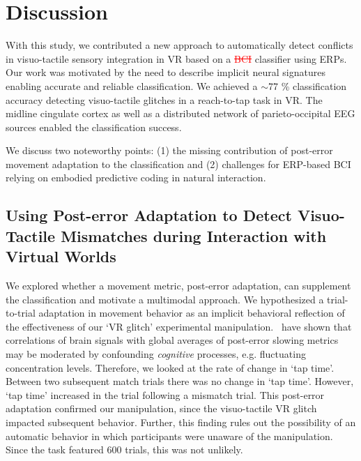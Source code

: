 \section{Discussion}

With this study, we contributed a new approach to automatically detect conflicts in visuo-tactile sensory integration in VR based on a \textcolor{red}{\st{BCI}} classifier using ERPs. Our work was motivated by the need to describe implicit neural signatures enabling accurate and reliable classification. We achieved a $\sim$77 \% classification accuracy detecting visuo-tactile glitches in a reach-to-tap task in VR. The midline cingulate cortex as well as a distributed network of parieto-occipital EEG sources enabled the classification success.

We discuss two noteworthy points: (1) the missing contribution of post-error movement adaptation to the classification and (2) challenges for \textcolor{new}{ERP-based} BCI relying on embodied predictive coding in natural interaction.

\subsection{Using Post-error Adaptation to Detect Visuo-Tactile Mismatches during Interaction with Virtual Worlds}

We explored whether a movement metric, post-error adaptation, can supplement the classification and motivate a multimodal approach. We hypothesized a trial-to-trial adaptation in movement behavior as an implicit behavioral reflection of the effectiveness of our `VR glitch' experimental manipulation.~\cite{Dutilh2012-ps} have shown that correlations of brain signals with global averages of post-error slowing metrics may be moderated by confounding \textit{cognitive} processes, e.g. fluctuating concentration levels. Therefore, we looked at the rate of change in `tap time'. Between two subsequent match trials there was no change in `tap time'. However, `tap time' increased in the trial following a mismatch trial. This post-error adaptation confirmed our manipulation, since the visuo-tactile VR glitch impacted subsequent behavior. Further, this finding rules out the possibility of an automatic behavior in which participants were unaware of the manipulation. Since the task featured 600 trials, this was not unlikely. 

